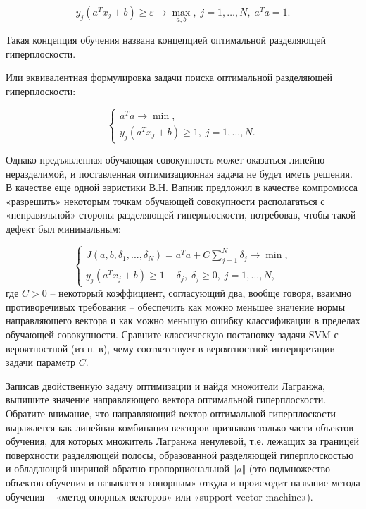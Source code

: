 \begin{problem}
\[y_{j} (a^{T} x_{j} +b)\ge \varepsilon \to \max_{a,b},\; j=1,\ldots,N, \; a^{T} a=1.  \] 

Такая концепция обучения названа концепцией оптимальной разделяющей гиперплоскости. 

Или эквивалентная формулировка задачи поиска оптимальной разделяющей гиперплоскости: 

\[\left\{\begin{array}{l} {a^{T} a\to \min ,} \\ {y_{j} (a^{T} x_{j} +b)\ge 1,\; j=1,...,N.} \end{array}\right. \] 

Однако предъявленная обучающая совокупность может оказаться линейно неразделимой, и поставленная оптимизационная задача не будет иметь решения. В качестве еще одной эвристики В.Н. Вапник предложил в качестве компромисса «разрешить» некоторым точкам обучающей совокупности располагаться с «неправильной» стороны разделяющей гиперплоскости, потребовав, чтобы такой дефект был минимальным: 

\[\left\{\begin{array}{l} {J(a,b,\delta _{1} ,...,\delta _{N} )=a^{T} a+C\sum _{j=1}^{N}\delta _{j}  \to \min ,} \\ {y_{j} (a^{T} x_{j} +b)\ge 1-\delta _{j} ,\; \delta _{j} \ge 0,\; j=1,...,N,} \end{array}\right. 
\] 
где $C>0$ -- некоторый коэффициент, согласующий два, вообще говоря, взаимно противоречивых требования -- обеспечить как можно меньшее значение нормы направляющего вектора и как можно меньшую ошибку классификации в пределах обучающей совокупности. Сравните классическую постановку задачи SVM с вероятностной (из п. в), чему соответствует в вероятностной интерпретации задачи параметр $C$.

Записав двойственную задачу оптимизации и найдя множители Лагранжа, выпишите значение направляющего вектора оптимальной гиперплоскости. Обратите внимание, что направляющий вектор оптимальной гиперплоскости выражается как линейная комбинация векторов признаков только части объектов обучения, для которых множитель Лагранжа ненулевой, т.е. лежащих за границей поверхности разделяющей полосы, образованной разделяющей гиперплоскостью и обладающей шириной обратно пропорциональной $\Vert a\Vert$ (это подмножество объектов обучения и называется «опорным» откуда и происходит название метода обучения -- «метод опорных векторов» или «support vector machine»).
\end{problem}


